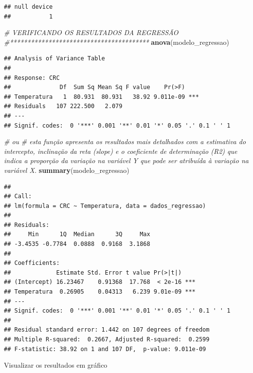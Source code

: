 \documentclass[
]{book}
\newenvironment{Shaded}{\begin{snugshade}}{\end{snugshade}}
\newcommand{\CommentTok}[1]{\textcolor[rgb]{0.56,0.35,0.01}{\textit{#1}}}
\newcommand{\KeywordTok}[1]{\textcolor[rgb]{0.13,0.29,0.53}{\textbf{#1}}}
\newcommand{\NormalTok}[1]{#1}
\begin{document}
\begin{verbatim}
## null device 
##           1
\end{verbatim}

\begin{Shaded}
\begin{Highlighting}[]
\CommentTok{# VERIFICANDO OS RESULTADOS DA REGRESSÃO}
\CommentTok{#****************************************}
\KeywordTok{anova}\NormalTok{(modelo_regressao)}
\end{Highlighting}
\end{Shaded}

\begin{verbatim}
## Analysis of Variance Table
## 
## Response: CRC
##              Df  Sum Sq Mean Sq F value    Pr(>F)    
## Temperatura   1  80.931  80.931   38.92 9.011e-09 ***
## Residuals   107 222.500   2.079                      
## ---
## Signif. codes:  0 '***' 0.001 '**' 0.01 '*' 0.05 '.' 0.1 ' ' 1
\end{verbatim}

\begin{Shaded}
\begin{Highlighting}[]
\CommentTok{# ou}
\CommentTok{# esta função apresenta os resultados mais detalhados com a estimativa do intercepto, inclinação da reta (slope) e o coeficiente de determinação (R2) que indica a proporção da variação na variável Y que pode ser atribuída à variação na variável X.}
\KeywordTok{summary}\NormalTok{(modelo_regressao)}
\end{Highlighting}
\end{Shaded}

\begin{verbatim}
## 
## Call:
## lm(formula = CRC ~ Temperatura, data = dados_regressao)
## 
## Residuals:
##     Min      1Q  Median      3Q     Max 
## -3.4535 -0.7784  0.0888  0.9168  3.1868 
## 
## Coefficients:
##             Estimate Std. Error t value Pr(>|t|)    
## (Intercept) 16.23467    0.91368  17.768  < 2e-16 ***
## Temperatura  0.26905    0.04313   6.239 9.01e-09 ***
## ---
## Signif. codes:  0 '***' 0.001 '**' 0.01 '*' 0.05 '.' 0.1 ' ' 1
## 
## Residual standard error: 1.442 on 107 degrees of freedom
## Multiple R-squared:  0.2667,	Adjusted R-squared:  0.2599 
## F-statistic: 38.92 on 1 and 107 DF,  p-value: 9.011e-09
\end{verbatim}

Visualizar os resultados em gráfico
\end{document}
